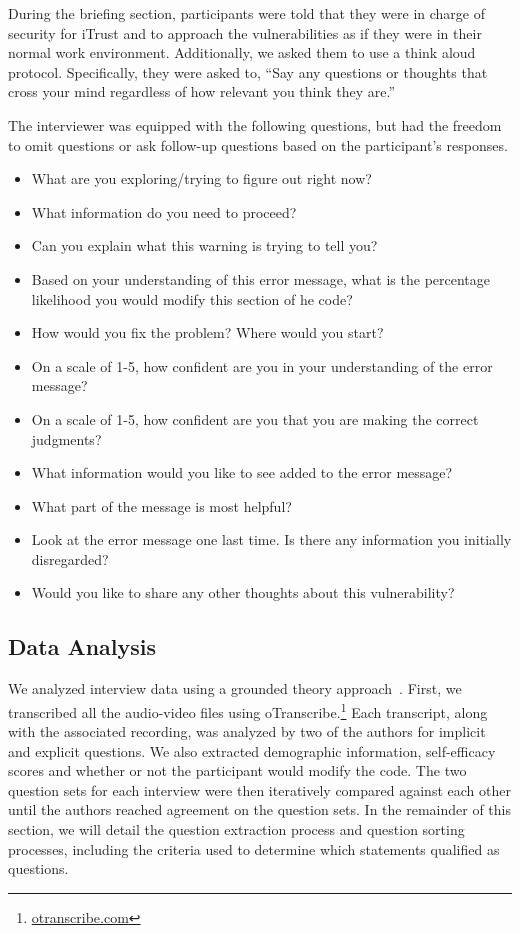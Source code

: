 \documentclass[conference]{IEEEtran}
\begin{document}
During the briefing section, participants were told that they were in charge of security for iTrust and to approach the vulnerabilities as if they were in their normal work environment.
Additionally, we asked them to use a think aloud protocol. Specifically, they were asked to, ``Say any questions or thoughts that cross your mind regardless of how relevant you think they are.''

The interviewer was equipped with the following questions, but had the freedom to omit questions or ask follow-up questions based on the participant's responses.
\begin{itemize}
\item What are you exploring/trying to figure out right now?
\item What information do you need to proceed?
\item Can you explain what this warning is trying to tell you?
\item Based on your understanding of this error message, what is the percentage likelihood you would modify this section of he code?
\item How would you fix the problem? Where would you start?
\item On a scale of 1-5, how confident are you in your understanding of the error message?
\item On a scale of 1-5, how confident are you that you are making the correct judgments?
\item What information would you like to see added to the error message?
\item What part of the message is most helpful?
\item Look at the error message one last time. Is there any information you initially disregarded?
\item Would you like to share any other thoughts about this vulnerability?
\end{itemize}

\subsection{Data Analysis}
\label{dataAnalysis}
We analyzed interview data using a grounded theory approach~\cite{glaser2009discovery}. 
First, we transcribed all the audio-video files using oTranscribe.\footnote{\url{otranscribe.com}}
Each transcript, along with the associated recording, was analyzed by two of the authors for implicit and explicit questions. 
We also extracted demographic information, self-efficacy scores and whether or not the participant would modify the code. 
The two question sets for each interview were then iteratively compared against each other until the authors reached agreement on the question sets. 
In the remainder of this section, we will detail the question extraction process and question sorting processes, including the criteria used to determine which statements qualified as questions.
\end{document}
